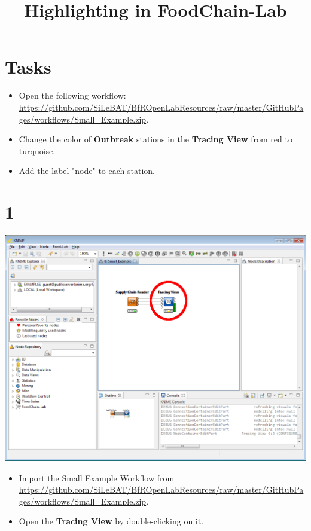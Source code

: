 \documentclass{beamer}
\title{Highlighting in FoodChain-Lab}
\date{}
\begin{document}
\maketitle

\section{Tasks}
\begin{frame}
	\begin{itemize}
		\item Open the following workflow: \url{https://github.com/SiLeBAT/BfROpenLabResources/raw/master/GitHubPages/workflows/Small_Example.zip}.
		\item Change the color of \textbf{Outbreak} stations in the \textbf{Tracing View} from red to turquoise.
		\item Add the label "node" to each station.
	\end{itemize}
\end{frame}
 
\section{1}
\begin{frame}
	\begin{center}
  		\includegraphics[height=0.6\textheight]{1.png}
	\end{center}
	\begin{itemize}
		\item Import the Small Example Workflow from \url{https://github.com/SiLeBAT/BfROpenLabResources/raw/master/GitHubPages/workflows/Small_Example.zip}.
		\item Open the \textbf{Tracing View} by double-clicking on it.
	\end{itemize}
\end{frame}
\end{document}
